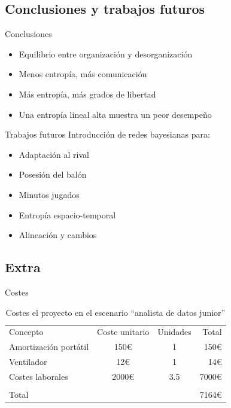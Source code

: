 \documentclass{beamer}
\begin{document}
%
\subsection{Conclusiones y trabajos futuros}

\begin{frame}{Conclusiones}
	\begin{itemize}
		\item Equilibrio entre organización y desorganización
		\item Menos entropía, más comunicación
		\item Más entropía, más grados de libertad 
		\item Una entropía lineal alta muestra un peor desempeño
	\end{itemize}
\end{frame}

\begin{frame}{Trabajos futuros}
	Introducción de redes bayesianas para:
	\begin{itemize}
		\item Adaptación al rival
		\item Posesión del balón
		\item Minutos jugados
		\item Entropía espacio-temporal
		\item Alineación y cambios
	\end{itemize}
\end{frame}

\subsection{Extra}

\begin{frame}{Costes}
	\begin{table}
		\begin{tabular}[h!tbp]{lccr}
		  Concepto & Coste unitario & Unidades & Total \\
		  Amortización portátil & 150€ & 1 & 150€ \\
		  Ventilador            & 12€  & 1 & 14€ \\
		  Costes laborales      & 2000€& 3.5 & 7000€ \\
		  \hline \\
		  \multicolumn{3}{l}{Total} & 7164€ \\
		\end{tabular}
		\caption{Costes el proyecto en el escenario ``analista de datos junior''} \label{tab:costes2}
	\end{table}
\end{frame}
\end{document}

